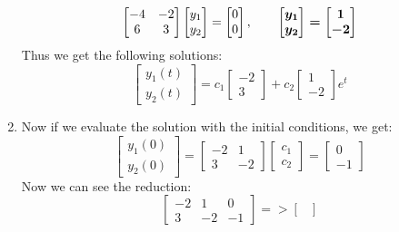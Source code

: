 \documentclass[12pt]{article}
\begin{document}
\begin{enumerate}[label = (\alph*)]
			$$
			\begin{bmatrix}
			-4 & -2 \\
			6 & 3
			\end{bmatrix}
			\begin{bmatrix}
			y_1 \\ y_2
			\end{bmatrix} 
			= 
			\begin{bmatrix}
			0 \\ 0
			\end{bmatrix}
			, \qquad 
			\text{\boldmath $
			\begin{bmatrix}
			y_1 \\ y_2
			\end{bmatrix}
			=
			\begin{bmatrix}
			1 \\ -2
			\end{bmatrix}$}
			$$
		Thus we get the following solutions:
			$$
			\begin{bmatrix}
				y_1(t) \\ y_2(t)
			\end{bmatrix}
			= 
			c_1
			\begin{bmatrix}
				-2 \\ 3
			\end{bmatrix} + 
			c_2
			\begin{bmatrix}
				1 \\ -2
			\end{bmatrix}e^{t}
			$$
		\item Now if we evaluate the solution with the initial conditions, we get: 
			$$
			\begin{bmatrix}
			y_1(0) \\ y_2(0)
			\end{bmatrix}
			= 
			\begin{bmatrix}
				-2 & 1 \\
				3 & -2
			\end{bmatrix}
			\begin{bmatrix}
				c_1 \\ c_2
			\end{bmatrix}
			= 
			\begin{bmatrix}
				0 \\ -1
			\end{bmatrix}
			$$
		Now we can see the reduction:
			$$
			\begin{bmatrix}
				-2 & 1 & 0 \\
				3 & -2 & -1
			\end{bmatrix}
			=>
			\begin{bmatrix}

\end{bmatrix}$$
\end{enumerate}
\end{document}
